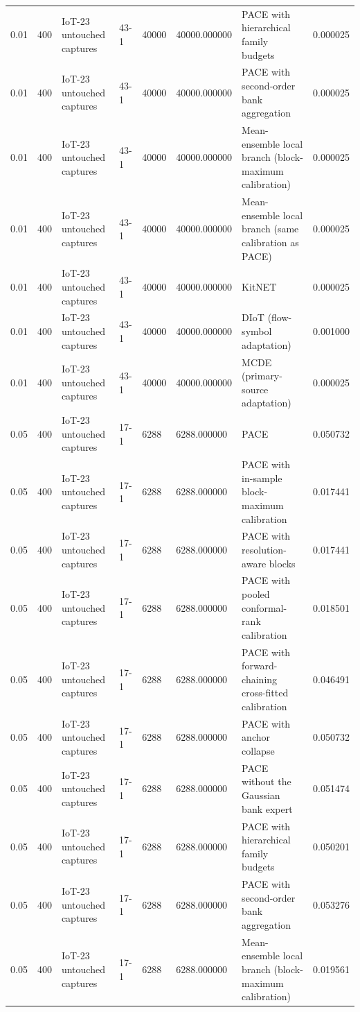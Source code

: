 \begin{tabular}{llllllll}
0.01 & 400 & IoT-23 untouched captures & 43-1 & 40000 & 40000.000000 & PACE with hierarchical family budgets & 0.000025 \\
0.01 & 400 & IoT-23 untouched captures & 43-1 & 40000 & 40000.000000 & PACE with second-order bank aggregation & 0.000025 \\
0.01 & 400 & IoT-23 untouched captures & 43-1 & 40000 & 40000.000000 & Mean-ensemble local branch (block-maximum calibration) & 0.000025 \\
0.01 & 400 & IoT-23 untouched captures & 43-1 & 40000 & 40000.000000 & Mean-ensemble local branch (same calibration as PACE) & 0.000025 \\
0.01 & 400 & IoT-23 untouched captures & 43-1 & 40000 & 40000.000000 & KitNET & 0.000025 \\
0.01 & 400 & IoT-23 untouched captures & 43-1 & 40000 & 40000.000000 & DIoT (flow-symbol adaptation) & 0.001000 \\
0.01 & 400 & IoT-23 untouched captures & 43-1 & 40000 & 40000.000000 & MCDE (primary-source adaptation) & 0.000025 \\
0.05 & 400 & IoT-23 untouched captures & 17-1 & 6288 & 6288.000000 & PACE & 0.050732 \\
0.05 & 400 & IoT-23 untouched captures & 17-1 & 6288 & 6288.000000 & PACE with in-sample block-maximum calibration & 0.017441 \\
0.05 & 400 & IoT-23 untouched captures & 17-1 & 6288 & 6288.000000 & PACE with resolution-aware blocks & 0.017441 \\
0.05 & 400 & IoT-23 untouched captures & 17-1 & 6288 & 6288.000000 & PACE with pooled conformal-rank calibration & 0.018501 \\
0.05 & 400 & IoT-23 untouched captures & 17-1 & 6288 & 6288.000000 & PACE with forward-chaining cross-fitted calibration & 0.046491 \\
0.05 & 400 & IoT-23 untouched captures & 17-1 & 6288 & 6288.000000 & PACE with anchor collapse & 0.050732 \\
0.05 & 400 & IoT-23 untouched captures & 17-1 & 6288 & 6288.000000 & PACE without the Gaussian bank expert & 0.051474 \\
0.05 & 400 & IoT-23 untouched captures & 17-1 & 6288 & 6288.000000 & PACE with hierarchical family budgets & 0.050201 \\
0.05 & 400 & IoT-23 untouched captures & 17-1 & 6288 & 6288.000000 & PACE with second-order bank aggregation & 0.053276 \\
0.05 & 400 & IoT-23 untouched captures & 17-1 & 6288 & 6288.000000 & Mean-ensemble local branch (block-maximum calibration) & 0.019561 \\

\end{tabular}
